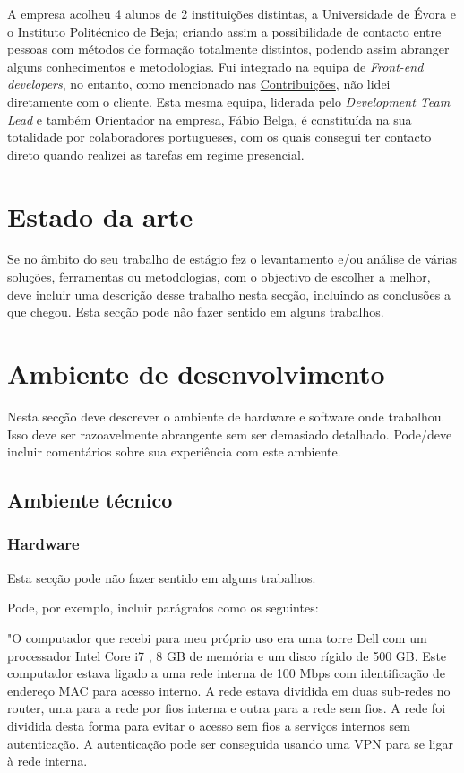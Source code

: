 \documentclass{article}
\begin{document}
\hspace*{0.5cm} A empresa acolheu 4 alunos de 2 instituições distintas, a Universidade de Évora e o Instituto Politécnico de Beja; criando assim a possibilidade de contacto entre pessoas com métodos de formação totalmente distintos, podendo assim abranger alguns conhecimentos e metodologias. Fui integrado na equipa de \emph{Front-end developers}, no entanto, como mencionado nas \hyperref[sec:cont]{Contribuições}, não lidei diretamente com o cliente. Esta mesma equipa, liderada pelo \emph{Development Team Lead} e também Orientador na empresa, Fábio Belga, é constituída na sua totalidade por colaboradores portugueses, com os quais consegui ter contacto direto quando realizei as tarefas em regime presencial. \newline

\cleardoublepage
\section{Estado da arte}
\label{sec:est-art}
Se no âmbito do seu trabalho de estágio fez o levantamento e/ou análise de várias soluções, ferramentas ou metodologias, com o objectivo de escolher a melhor, deve incluir uma descrição desse trabalho nesta secção, incluindo as conclusões a que chegou.
Esta secção pode não fazer sentido em alguns trabalhos.


\cleardoublepage
\section{Ambiente de desenvolvimento}
\label{sec:amb-dev}
Nesta secção deve descrever o ambiente de hardware e software onde trabalhou. Isso deve ser razoavelmente abrangente sem ser demasiado detalhado. Pode/deve incluir comentários sobre sua experiência com este ambiente.

\subsection{Ambiente técnico}
\subsubsection{Hardware}
Esta secção pode não fazer sentido em alguns trabalhos.

Pode, por exemplo, incluir parágrafos como os seguintes:

"O computador que recebi para meu próprio uso era uma torre Dell com um processador Intel Core i7 , 8 GB de memória e um disco rígido de 500 GB. Este computador estava ligado a uma rede interna de 100 Mbps com identificação de endereço MAC para acesso interno. A rede estava dividida em duas sub-redes no router, uma para a rede por fios interna e outra para a rede sem fios. A rede foi dividida desta forma para evitar o acesso sem fios a serviços internos sem autenticação. A autenticação pode ser conseguida usando uma VPN para se ligar à rede interna.
\end{document}
